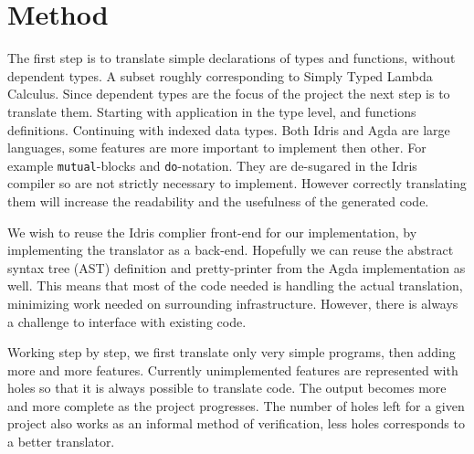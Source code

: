 \documentclass[parskip=half]{scrartcl}
\begin{document}
\section{Method}
The first step is to translate simple declarations of types and functions,
without dependent types. A subset roughly corresponding to Simply Typed Lambda
Calculus. Since dependent types are the focus of the project the next step is
to translate them. Starting with application in the type level, and functions
definitions. Continuing with indexed data types.
Both Idris and Agda are large languages, some features are more important to
implement then other.  For example \texttt{mutual}-blocks and
\texttt{do}-notation. They are de-sugared in the Idris compiler so are not
strictly necessary to implement. However correctly translating them will
increase the readability and the usefulness of the generated code.





We wish to reuse the Idris complier front-end for our implementation, by
implementing the translator as a back-end. Hopefully we can reuse the abstract
syntax tree (AST) definition and pretty-printer from the Agda implementation as
well. This means that most of the code needed is handling the actual
translation, minimizing work needed on surrounding infrastructure.  However,
there is always a challenge to interface with existing code.


Working step by step, we first translate only very simple programs, then adding
more and more features. Currently unimplemented features are represented with
holes so that it is always possible to translate code. The output becomes more
and more complete as the project progresses. The number of holes left for
a given project also works as an informal method of verification, less holes
corresponds to a better translator.
\end{document}
